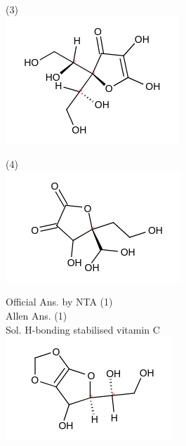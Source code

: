 \documentclass[10pt]{article}
\begin{document}
(3)\\
\includegraphics{smile-ffd8877558aeaa2c07f9011a6224f5f6e8b788d1}

(4)\\
\includegraphics{smile-16a52fbb09d10e0fb8d19da0c54b9b50ee3a8ea0}

Official Ans. by NTA (1)\\
Allen Ans. (1)\\
Sol. H-bonding stabilised vitamin C\\
\includegraphics{smile-241821a1a2b3dc72f8b78b7bda8b0630f949793e}
\end{document}
